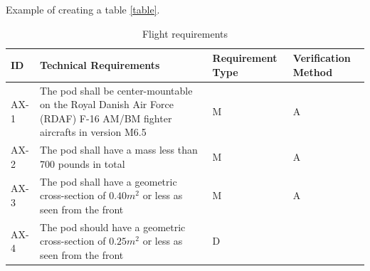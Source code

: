 Example of creating a table \ref{table}.
\begin{table}[htbp]
	\begin{tabular}{|m{1.5cm}|m{8cm}|m{2.5cm}|m{2.5cm}|}
		\hline
		\rowcolor{lightgray} \textbf{ID} & \textbf{Technical Requirements}  & \textbf{Requirement Type}  &  \textbf{Verification Method}    \\ \hline
		AX-1 & The pod shall be center-mountable on the Royal Danish Air Force (RDAF) F-16 AM/BM fighter aircrafts in version M6.5     & M   & A      \\ \hline
		\rowcolor{Seashell2} AX-2 & The pod shall have a mass less than 700 pounds in total & M  & A        \\ \hline
		AX-3 & The pod shall have a geometric cross-section of $0.40m^2$  or less as seen from the front   &  M   & A                \\ \hline
		\rowcolor{Seashell2} AX-4 & The pod should have a geometric cross-section of $0.25m^2$ or less as seen from the front   &  D   &                \\ \hline
	\end{tabular}
	\caption{Flight requirements}
	\label{tab:TechRequirements}
\end{table}




